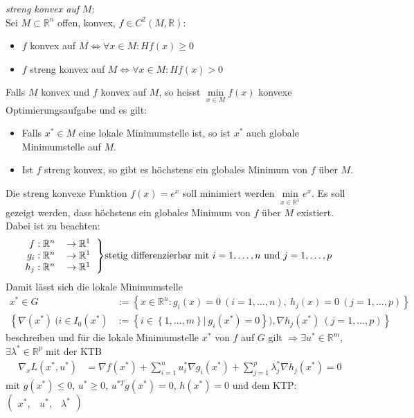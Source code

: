 \textit{streng konvex auf} $M$:\\
Sei $M\subset\mathbb{R}^n$ offen, konvex, $f\in C^2(M,\mathbb{R})$:
\begin{itemize}
  \item $f$ konvex auf $M\Leftrightarrow\forall x\in M:H f(x)\ge 0$
  \item $f$ streng konvex auf $M\Leftrightarrow\forall x\in M: H f(x)>0$
\end{itemize}
Falls $M$ konvex und $f$ konvex auf $M$, so heisst $\min\limits_{x\in M}f(x)$ konvexe Optimierungsaufgabe und es gilt:
\begin{itemize}
  \item Falls $x^{\ast}\in M$ eine lokale Minimumstelle ist, so ist $x^{\ast}$ auch globale Minimumstelle auf $M$.
  \item Ist $f$ streng konvex, so gibt es höchstens ein globales Minimum von $f$ über $M$.
\end{itemize}
\begin{exmp}
Die streng konvexe Funktion $f(x)=e^x$ soll minimiert werden $\min\limits_{x\in\mathbb{R}^1}e^x$. Es soll gezeigt werden, dass höchstens ein globales Minimum von $f$ über $M$ existiert.
Dabei ist zu beachten:
\begin{align*}
\left.
 \begin{tabular}{rl}
 $f:\mathbb{R}^n$ & $\rightarrow \mathbb{R}^1$\\
 $g_i:\mathbb{R}^n$ & $\rightarrow \mathbb{R}^1$\\
 $h_j:\mathbb{R}^n$ & $\rightarrow \mathbb{R}^1$
 \end{tabular}\right\} & \text{stetig differenzierbar mit }i=1,\ldots,n\text{ und } j=1,\ldots,p
\end{align*}
Damit lässt sich die lokale Minimumstelle
\begin{align*}
x^{\ast}\in G & := \left\{ x\in\mathbb{R}^n:g_i(x)=0\ (i=1,\ldots,n),\ h_j(x)=0\ (j=1,\ldots,p) \right\}\\
\left\{ \nabla(x^{\ast})\ (i\in I_0(x^{\ast}) \right. & \left. := \left\{ i\in\left\{1,\ldots,m\right\}|\ g_i(x^{\ast})=0 \right\}),\nabla h_j(x^{\ast})\ (j=1,\ldots,p) \right\} 
\end{align*}
beschreiben und für die lokale Minimumstelle $x^{\ast}$ von $f$ auf $G$  gilt $\Rightarrow\exists u^{\ast}\in\mathbb{R}^m$, $\exists\lambda^{\ast}\in\mathbb{R}^p$ mit der \ac{KTB}
\begin{align*}
	\nabla_x L(x^{\ast},u^{\ast}) & = \nabla f(x^{\ast})+\sum\limits_{i=1}^n u_i^{\ast}\nabla g_i(x^{\ast})+\sum\limits_{j=1}^p\lambda_j^{\ast}\nabla h_j(x^{\ast})=0
\end{align*}
mit $g(x^{\ast})\le 0$, $u^{\ast}\ge 0$, $u^{\ast T}g(x^{\ast})=0$, $h(x^{\ast})=0$ und dem \ac{KTP}: $\begin{pmatrix}x^{\ast}, & u^{\ast}, & \lambda^{\ast} \end{pmatrix}$
\end{exmp}
 
